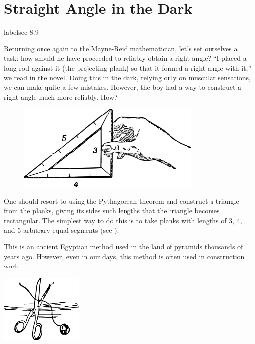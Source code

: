 \section{Straight Angle in the Dark}
label{sec-8.9}

\ques Returning once again to the Mayne-Reid mathematician, let's set ourselves a task: how should he have proceeded to reliably obtain a right angle? ``I placed a long rod against it (the projecting plank) so that it formed a right angle with it,'' we read in the novel. Doing this in the dark, relying only on muscular sensations, we can make quite a few mistakes. However, the boy had a way to construct a right angle much more reliably. How?

\begin{figure}[h!]
\centering
\includegraphics[width=0.8\textwidth]{figures/ch-08/fig-122.pdf}
\end{figure}

\ans One should resort to using the Pythagorean theorem and construct a triangle from the planks, giving its sides such lengths that the triangle becomes rectangular. The simplest way to do this is to take planks with lengths of 3, 4, and 5 arbitrary equal segments (see ).





This is an ancient Egyptian method used in the land of pyramids thousands of years ago. However, even in our days, this method is often used in construction work.

\vspace{2cm}

\begin{center}
\includegraphics[width=0.3\textwidth]{figures/ch-08/fig-ch-08-tail.pdf}
\end{center}


















